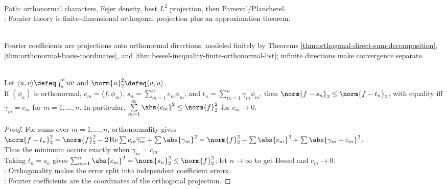 \begin{perspective} \label{per:fourier-plancherel-roadmap-tao} \\
Path: orthonormal characters, Fejer density, best $L^2$ projection, then Parseval/Plancherel.\\
: Fourier theory is finite-dimensional orthogonal projection plus an approximation theorem.
\end{perspective}

\begin{perspective} \label{per:fourier-coefficients-as-projections} \\
Fourier coefficients are projections onto orthonormal directions, modeled finitely by Theorems \ref{thm:orthogonal-direct-sum-decomposition}, \ref{thm:orthonormal-basis-coordinates}, and \ref{thm:bessel-inequality-finite-orthonormal-list}; infinite directions make convergence separate.
\end{perspective}

\begin{theorem} \label{thm:orthonormal-fourier-best-approximation-bessel} \\
Let $\langle u,v\rangle\defeq\int_a^b u\overline v$ and $\norm{u}_2^2\defeq\langle u,u\rangle$.\\
If $(\phi_n)$ is orthonormal, $c_m=\langle f,\phi_m\rangle$, $s_n=\sum\limits_{m=1}^{n}c_m\phi_m$, and $t_n=\sum\limits_{m=1}^{n}\gamma_m\phi_m$, then $\norm{f-s_n}_2\leq\norm{f-t_n}_2$, with equality iff $\gamma_m=c_m$ for $m=1,\ldots,n$. In particular, $\sum\limits_{m=1}^{\infty}\abs{c_m}^2\leq\norm{f}_2^2$ for $c_m\to0$.
\begin{proof}
For sums over $m=1,\ldots,n$, orthonormality gives\\
$\norm{f-t_n}_2^2 =\norm{f}_2^2-2\operatorname{Re}\sum c_m\overline{\gamma_m}+\sum\abs{\gamma_m}^2 =\norm{f}_2^2-\sum\abs{c_m}^2+\sum\abs{\gamma_m-c_m}^2$.\\
Thus the minimum occurs exactly when $\gamma_m=c_m$.\\
Taking $t_n=s_n$ gives $\sum_{m=1}^{n}\abs{c_m}^2=\norm{s_n}_2^2\leq\norm{f}_2^2$; let $n\to\infty$ to get Bessel and $c_m\to0$.\\
: Orthogonality makes the error split into independent coefficient errors.\\
: Fourier coefficients are the coordinates of the orthogonal projection.
\end{proof}
\end{theorem}

